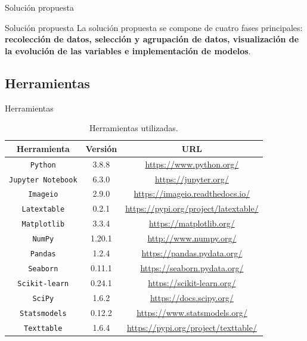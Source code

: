 \documentclass[11pt]{beamer}
\begin{document}
\begin{frame}{Solución propuesta}
\begin{block}{Solución propuesta} \justifying
La solución propuesta se compone de cuatro fases principales: \textbf{recolección de datos, selección y agrupación de datos, visualización de la evolución de las variables e implementación de modelos}.
\end{block}
\end{frame}
\subsection{Herramientas}
\begin{frame}{Herramientas}
\begin{table}[H]
{\centering
	\caption{Herramientas utilizadas.}
	\begin{adjustbox}{width=0.9\textwidth}
	\begin{tabular}{|c|c|c|}
		\hline 
		Herramienta & Versión & URL\\
			\hline
			\texttt{Python} & 3.8.8 & \url{https://www.python.org/}\\
			\hline
			\texttt{Jupyter Notebook} & 6.3.0 & \url{https://jupyter.org/}\\
			\hline
			\texttt{Imageio} & 2.9.0 & \url{https://imageio.readthedocs.io/}\\
			\hline
			\texttt{Latextable} & 0.2.1 & \url{https://pypi.org/project/latextable/}\\
			\hline
			\texttt{Matplotlib} & 3.3.4 & \url{https://matplotlib.org/}\\
			\hline
			\texttt{NumPy} & 1.20.1 & \url{http://www.numpy.org/}\\
			\hline
			\texttt{Pandas} & 1.2.4 & \url{https://pandas.pydata.org/}\\
			\hline
			\texttt{Seaborn} & 0.11.1 & \url{https://seaborn.pydata.org/}\\
			\hline
			\texttt{Scikit-learn} & 0.24.1 & \url{https://scikit-learn.org/}\\
			\hline
			\texttt{SciPy} & 1.6.2 & \url{https://docs.scipy.org/}\\
			\hline
			\texttt{Statsmodels} & 0.12.2 & \url{https://www.statsmodels.org/}\\
			\hline
			\texttt{Texttable} & 1.6.4 & \url{https://pypi.org/project/texttable/}\\
			\hline
		\end{tabular}
		\end{adjustbox}
	\label{tab:Herramientas utilizadas}
	}
\end{table}
\end{frame}
\end{document}
